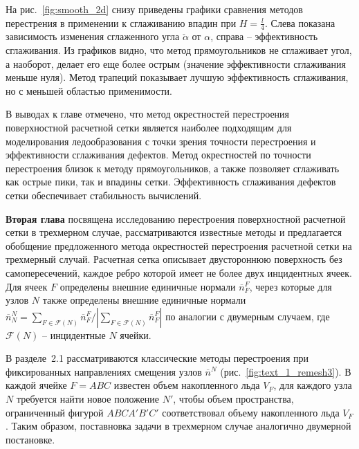 \documentclass[a4paper,14pt]{extarticle}                     %
\theoremstyle{plain}                                         %
\begin{document}
На рис.~\ref{fig:smooth_2d} снизу приведены графики сравнения методов перестрения в применении к сглаживанию впадин при $H = \frac{l}{4}$.
Слева показана зависимость изменения сглаженного угла $\check{\alpha}$ от $\alpha$, справа -- эффективность сглаживания.
Из графиков видно, что метод прямоугольников не сглаживает угол, а наоборот, делает его еще более острым (значение эффективности сглаживания меньше нуля).
Метод трапеций показывает лучшую эффективность сглаживания, но с меньшей областью применимости.

В выводах к главе отмечено, что метод окрестностей перестроения поверхностной расчетной сетки является наиболее подходящим для моделирования ледообразования с точки зрения точности перестроения и эффективности сглаживания дефектов.
Метод окрестностей по точности перестроения близок к методу прямоугольников, а также позволяет сглаживать как острые пики, так и впадины сетки.
Эффективность сглаживания дефектов сетки обеспечивает стабильность вычислений.


\textbf{Вторая глава} посвящена исследованию перестроения поверхностной расчетной сетки в трехмерном случае, рассматриваются известные методы и предлагается обобщение предложенного метода окрестностей перестроения расчетной сетки на трехмерный случай.
Расчетная сетка описывает двустороннюю поверхность без самопересечений, каждое ребро которой имеет не более двух инцидентных ячеек.
Для ячеек $F$ определены внешние единичные нормали $\overline{n}_F^F$, через которые для узлов $N$ также определены внешние единичные нормали $\overline{n}_N^N = \sum_{F \in \mathscr{F}(N)}{\overline{n}_F^F} / |\sum_{F \in \mathscr{F}(N)}{\overline{n}_F^F}|$ по аналогии с двумерным случаем, где $\mathscr{F}(N)$ -- инцидентные $N$ ячейки.


В разделе~2.1 рассматриваются классические методы перестроения при фиксированных направлениях смещения узлов $\overline{n}^N$ (рис.~\ref{fig:text_1_remesh3}).
В каждой ячейке $F = ABC$ известен объем накопленного льда $V_F$, для каждого узла $N$ требуется найти новое положение $N'$, чтобы объем пространства, ограниченный фигурой $ABCA'B'C'$ соответствовал объему накопленного льда $V_F$.
Таким образом, поставновка задачи в трехмерном случае аналогично двумерной постановке.
\end{document}
